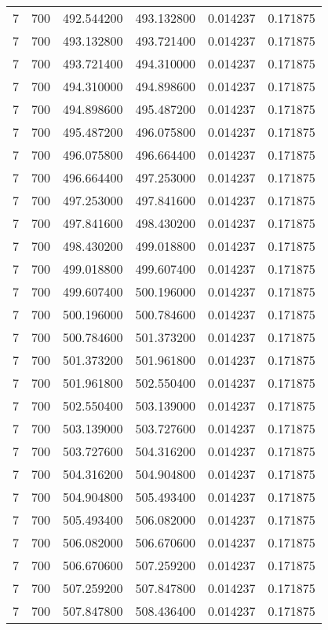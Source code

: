 \begin{longtable}{rrrrrr}
7 & 700 & 492.544200 & 493.132800 & 0.014237 & 0.171875 \\
7 & 700 & 493.132800 & 493.721400 & 0.014237 & 0.171875 \\
7 & 700 & 493.721400 & 494.310000 & 0.014237 & 0.171875 \\
7 & 700 & 494.310000 & 494.898600 & 0.014237 & 0.171875 \\
7 & 700 & 494.898600 & 495.487200 & 0.014237 & 0.171875 \\
7 & 700 & 495.487200 & 496.075800 & 0.014237 & 0.171875 \\
7 & 700 & 496.075800 & 496.664400 & 0.014237 & 0.171875 \\
7 & 700 & 496.664400 & 497.253000 & 0.014237 & 0.171875 \\
7 & 700 & 497.253000 & 497.841600 & 0.014237 & 0.171875 \\
7 & 700 & 497.841600 & 498.430200 & 0.014237 & 0.171875 \\
7 & 700 & 498.430200 & 499.018800 & 0.014237 & 0.171875 \\
7 & 700 & 499.018800 & 499.607400 & 0.014237 & 0.171875 \\
7 & 700 & 499.607400 & 500.196000 & 0.014237 & 0.171875 \\
7 & 700 & 500.196000 & 500.784600 & 0.014237 & 0.171875 \\
7 & 700 & 500.784600 & 501.373200 & 0.014237 & 0.171875 \\
7 & 700 & 501.373200 & 501.961800 & 0.014237 & 0.171875 \\
7 & 700 & 501.961800 & 502.550400 & 0.014237 & 0.171875 \\
7 & 700 & 502.550400 & 503.139000 & 0.014237 & 0.171875 \\
7 & 700 & 503.139000 & 503.727600 & 0.014237 & 0.171875 \\
7 & 700 & 503.727600 & 504.316200 & 0.014237 & 0.171875 \\
7 & 700 & 504.316200 & 504.904800 & 0.014237 & 0.171875 \\
7 & 700 & 504.904800 & 505.493400 & 0.014237 & 0.171875 \\
7 & 700 & 505.493400 & 506.082000 & 0.014237 & 0.171875 \\
7 & 700 & 506.082000 & 506.670600 & 0.014237 & 0.171875 \\
7 & 700 & 506.670600 & 507.259200 & 0.014237 & 0.171875 \\
7 & 700 & 507.259200 & 507.847800 & 0.014237 & 0.171875 \\
7 & 700 & 507.847800 & 508.436400 & 0.014237 & 0.171875 \\

\end{longtable}
